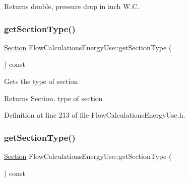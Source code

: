 \begin{DoxyReturn}{Returns}
double, pressure drop in inch W.\+C. 
\end{DoxyReturn}
\mbox{\label{class_flow_calculations_energy_use_ae88cc4f93028907c4c12e8925f63266b}} 
\subsubsection{\texorpdfstring{get\+Section\+Type()}{getSectionType()}\hspace{0.1cm}{\footnotesize\ttfamily [1/3]}}
{\footnotesize\ttfamily \hyperlink{class_flow_calculations_energy_use_afbabab0da698748de91369a5dfc7662a}{Section} Flow\+Calculations\+Energy\+Use\+::get\+Section\+Type (\begin{DoxyParamCaption}{ }\end{DoxyParamCaption}) const\hspace{0.3cm}{\ttfamily [inline]}}

Gets the type of section

\begin{DoxyReturn}{Returns}
Section, type of section 
\end{DoxyReturn}


Definition at line 213 of file Flow\+Calculations\+Energy\+Use.\+h.

\mbox{\label{class_flow_calculations_energy_use_ae88cc4f93028907c4c12e8925f63266b}} 
\subsubsection{\texorpdfstring{get\+Section\+Type()}{getSectionType()}\hspace{0.1cm}{\footnotesize\ttfamily [2/3]}}
{\footnotesize\ttfamily \hyperlink{class_flow_calculations_energy_use_afbabab0da698748de91369a5dfc7662a}{Section} Flow\+Calculations\+Energy\+Use\+::get\+Section\+Type (\begin{DoxyParamCaption}{ }\end{DoxyParamCaption}) const\hspace{0.3cm}{\ttfamily [inline]}}

